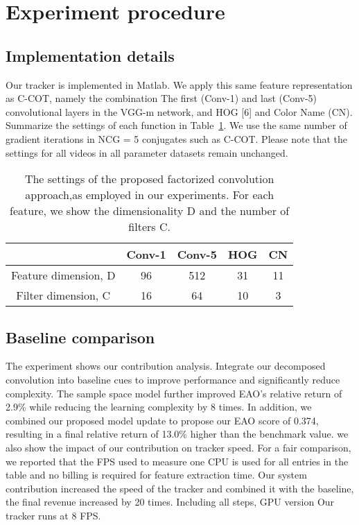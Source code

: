 \documentclass[a4paper,18pt]{article}
\begin{document}
\section{Experiment procedure}
\subsection{Implementation details}
Our tracker is implemented in Matlab. We apply this same feature representation as C-COT, namely the combination
The first (Conv-1) and last (Conv-5) convolutional layers in the VGG-m network, and HOG [6] and
Color Name (CN)\cite{van_2009_Learning}. Summarize the settings of each function in Table~\ref{table1}. We use the same number of gradient iterations in NCG = 5 conjugates such as C-COT. Please note that the settings for all videos in all parameter datasets remain unchanged.
\begin{table}[h]%
	\centering 
	\caption{The settings of the proposed factorized convolution approach,as employed in our experiments. For each feature, we show the dimensionality D and the number of filters C.
	}\label{table1}
		\tabcolsep 0.02in 
	\begin{tabular}{c|c|c|c|c}
		\hline
		& Conv-1 &  Conv-5 &  HOG &CN\\
		\hline
		Feature dimension, D &  96 & 512 &31 &11 \\
		\hline
		Filter dimension, C &  16 & 64 &  10 &3\\
		\hline
	\end{tabular}
\end{table}
\subsection{Baseline comparison}
The experiment shows our contribution analysis. Integrate our decomposed convolution into baseline cues to improve performance and significantly reduce complexity. The sample space model further improved EAO's relative return of 2.9\% while reducing the learning complexity by 8 times. In addition, we combined our proposed model update to propose our EAO score of 0.374, resulting in a final relative return of 13.0\% higher than the benchmark value. we also show the impact of our contribution on tracker speed. For a fair comparison, we reported that the FPS used to measure one CPU is used for all entries in the table and no billing is required for feature extraction time. Our system contribution increased the speed of the tracker and combined it with the baseline, the final revenue increased by 20 times. Including all steps, GPU version Our tracker runs at 8 FPS.
\end{document}
